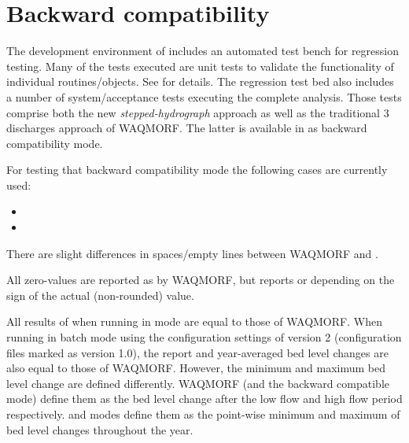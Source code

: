 \chapter{Backward compatibility} \label{Chp:Backward}

The development environment of \dfastmi includes an automated test bench for regression testing.
Many of the tests executed are unit tests to validate the functionality of individual routines/objects.
See \citet{trm} for details.
The regression test bed also includes a number of system/acceptance tests executing the complete \dfmi analysis.
Those tests comprise both the new \emph{stepped-hydrograph} approach as well as the traditional 3 discharges approach of WAQMORF.
The latter is available in  as backward compatibility mode.

For testing that backward compatibility mode the following cases are currently used:

\begin{itemize}
\item {}
\item {}
\end{itemize}

\begin{Remark}
\item There are slight differences in spaces/empty lines between WAQMORF and \dfmi.
\item All zero-values are reported as  by WAQMORF, but \dfmi reports  or  depending on the sign of the actual (non-rounded) value.
\item All results of \dfmi when running in  mode are equal to those of WAQMORF.
When \dfmi running in batch mode using the configuration settings of \dfmi version 2 (configuration files marked as version 1.0), the report and year-averaged bed level changes are also equal to those of WAQMORF.
However, the minimum and maximum bed level change are defined differently.
WAQMORF (and the backward compatible \dfmi{}  mode) define them as the bed level change after the low flow and high flow period respectively.
\dfmi{}  and  modes define them as the point-wise minimum and maximum of bed level changes throughout the year.
\end{Remark}

